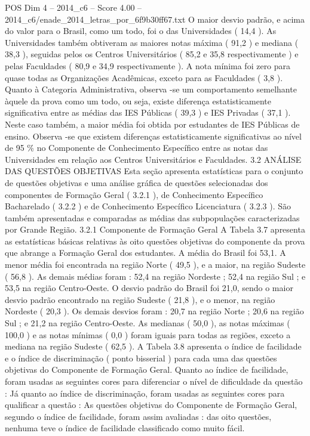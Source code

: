\begin{textsample}{POS Dim 4 – 2014\_c6 – Score 4.00 – 2014\_c6/enade\_2014\_letras\_por\_6f9b30ff67.txt}
O maior desvio padrão, e acima do valor para o Brasil, como um todo, foi o das Universidades ( 14,4 ).
As Universidades também obtiveram as maiores notas máxima ( 91,2 ) e mediana ( 38,3 ), seguidas pelos os Centros Universitários ( 85,2 e 35,8 respectivamente ) e pelas Faculdades ( 80,9 e 34,9 respectivamente ).
A nota mínima foi zero para quase todas as Organizações Acadêmicas, exceto para as Faculdades ( 3,8 ).
Quanto à Categoria Administrativa, observa -se um comportamento semelhante àquele da prova como um todo, ou seja, existe diferença estatisticamente significativa entre as médias das IES Públicas ( 39,3 ) e IES Privadas ( 37,1 ).
Neste caso também, a maior média foi obtida por estudantes de IES Públicas de ensino.
Observa -se que existem diferenças estatisticamente significativas ao nível de 95 \% no Componente de Conhecimento Específico entre as notas das Universidades em relação aos Centros Universitários e Faculdades. 3.2 ANÁLISE DAS QUESTÕES OBJETIVAS Esta seção apresenta estatísticas para o conjunto de questões objetivas e uma análise gráfica de questões selecionadas dos componentes de Formação Geral ( 3.2.1 ), de Conhecimento Específico Bacharelado ( 3.2.2 ) e de Conhecimento Específico Licenciatura ( 3.2.3 ).
São também apresentadas e comparadas as médias das subpopulações caracterizadas por Grande Região. 3.2.1 Componente de Formação Geral A Tabela 3.7 apresenta as estatísticas básicas relativas às oito questões objetivas do componente da prova que abrange a Formação Geral dos estudantes.
A média do Brasil foi 53,1.
A menor média foi encontrada na região Norte ( 49,5 ), e a maior, na região Sudeste ( 56,8 ).
As demais médias foram : 52,4 na região Nordeste ; 52,4 na região Sul ; e 53,5 na região Centro-Oeste.
O desvio padrão do Brasil foi 21,0, sendo o maior desvio padrão encontrado na região Sudeste ( 21,8 ), e o menor, na região Nordeste ( 20,3 ).
Os demais desvios foram : 20,7 na região Norte ; 20,6 na região Sul ; e 21,2 na região Centro-Oeste.
As medianas ( 50,0 ), as notas máximas ( 100,0 ) e as notas mínimas ( 0,0 ) foram iguais para todas as regiões, exceto a mediana na região Sudeste ( 62,5 ).
A Tabela 3.8 apresenta o índice de facilidade e o índice de discriminação ( ponto bisserial ) para cada uma das questões objetivas do Componente de Formação Geral.
Quanto ao índice de facilidade, foram usadas as seguintes cores para diferenciar o nível de dificuldade da questão : Já quanto ao índice de discriminação, foram usadas as seguintes cores para qualificar a questão : As questões objetivas do Componente de Formação Geral, segundo o índice de facilidade, foram assim avaliadas : das oito questões, nenhuma teve o índice de facilidade classificado como muito fácil.

\end{textsample}
